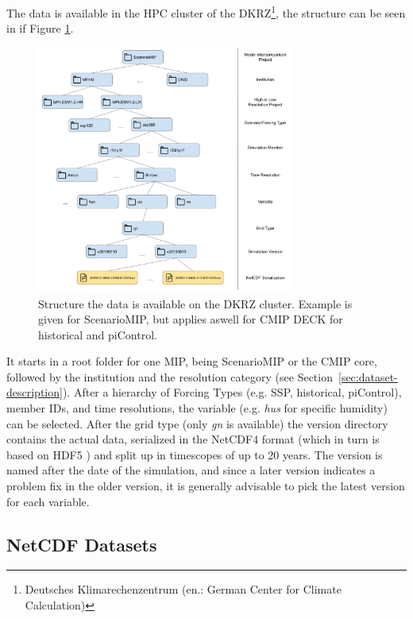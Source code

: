 The data is available in the HPC cluster of the DKRZ\footnote{Deutsches Klimarechenzentrum (en.: German Center for Climate Calculation)}, the structure can be seen in if Figure \ref{fig:data-structure}.

\begin{figure}[htb]
  \begin{center}
    \includegraphics[width=0.75\textwidth]{figures/data_structure.png}
  \end{center}
  \caption{Structure the data is available on the DKRZ cluster. Example is given for ScenarioMIP, but applies aswell for CMIP DECK for historical and piControl.}\label{fig:data-structure}
\end{figure}

It starts in a root folder for one MIP, being ScenarioMIP or the CMIP core, followed by the institution and the resolution category (see Section~\ref{sec:dataset-description}). 
After a hierarchy of Forcing Types (e.g. SSP, historical, piControl), member IDs, and time resolutions, the variable (e.g. \textit{hus} for specific humidity) can be selected. 
After the grid type (only \textit{gn} is available) the version directory contains the actual data, serialized in the NetCDF4 format (which in turn is based on HDF5 \cite{folk_overview_2011}) and  split up in timescopes of up to 20 years. 
The version is named after the date of the simulation, and since a later version indicates a problem fix in the older version, it is generally advisable to pick the latest version for each variable. 


\subsection{NetCDF Datasets}

